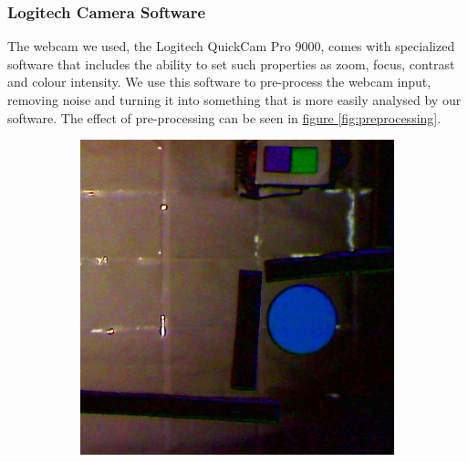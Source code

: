 \documentclass[10pt, abstracton, twocolumn]{scrartcl}
\newcommand{\fref}[1]{\hyperref[#1]{figure \vref{#1}}}
\begin{document}
\subsubsection{Logitech Camera Software}
The webcam we used, the Logitech QuickCam Pro 9000, comes with specialized software that includes the ability to set such properties as zoom, focus, contrast and colour intensity. We use this software to pre-process the webcam input, removing noise and turning it into something that is more easily analysed by our software. The effect of pre-processing can be seen in \fref{fig:preprocessing}.

\begin{figure}
        \centering
        \begin{subfigure}[t]{0.45\columnwidth}
        \centering
        \includegraphics[width=\columnwidth]{pictures/preprocessing1.png}
        \end{subfigure}
        \begin{subfigure}[t]{0.45\columnwidth}
        \centering

\end{subfigure}
\end{figure}
\end{document}
